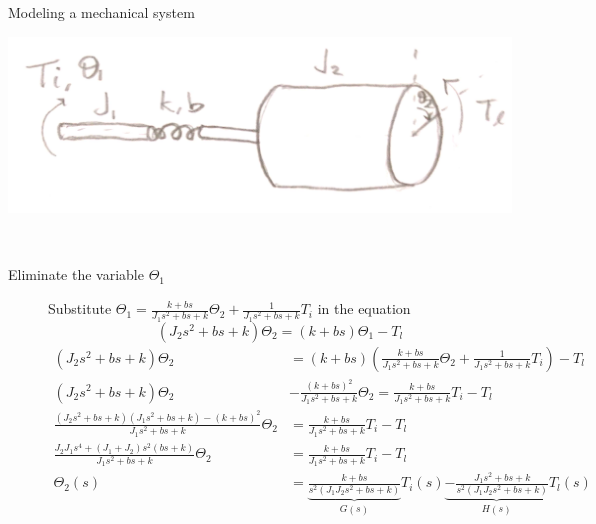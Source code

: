 \documentclass[dvisvgm,hypertex,aspectratio=169]{beamer}
\begin{document}
  \begin{frame}[label=M2]{Modeling a mechanical system}

    \begin{center}
      \includegraphics[width=0.3\linewidth]{elastic-shaft.jpg}
      \\
    \end{center}
    \scriptsize
    \begin{description}
    \item[Eliminate the variable \(\Theta_1\)]
      Substitute \(\Theta_1 = \frac{k+bs}{J_1s^2 + bs + k}\Theta_2 + \frac{1}{J_1s^2 + bs + k}T_i\) 
      in the equation \[(J_2s^2 + bs + k)\Theta_2 = (k + bs) \Theta_1 - T_l\]
      {\tiny
      \begin{align*}
        (J_2s^2 + bs + k)\Theta_2 &= (k+bs) \left(\frac{k + bs}{J_1s^2 + bs + k} \Theta_2 + \frac{1}{J_1s^2 + bs + k}T_i\right) - T_l\\
        (J_2s^2 + bs + k)\Theta_2  &- \frac{(k+bs)^2}{J_1s^2 + bs + k}\Theta_2 = \frac{k+bs}{J_1s^2 + bs + k} T_i - T_l\\
        \frac{(J_2s^2 + bs +k)(J_1s^2 + bs + k) - (k+bs)^2}{J_1s^2 + bs + k} \Theta_2 &= \frac{k+bs}{J_1s^2 + bs + k} T_i - T_l\\
        \frac{J_2J_1s^4 + (J_1+J_2)s^2(bs +k)}{J_1s^2 + bs + k} \Theta_2 &= \frac{k+bs}{J_1s^2 + bs + k} T_i - T_l\\
        \Theta_2(s) &= \underbrace{\frac{k + bs}{s^2(J_1J_2s^2 + bs + k)}}_{G(s)}T_i(s) \underbrace{- \frac{J_1s^2 + bs + k}{s^2(J_1J_2s^2 + bs + k)}}_{H(s)}T_l(s)
      \end{align*}}
    \end{description}      
  \end{frame}
\end{document}
